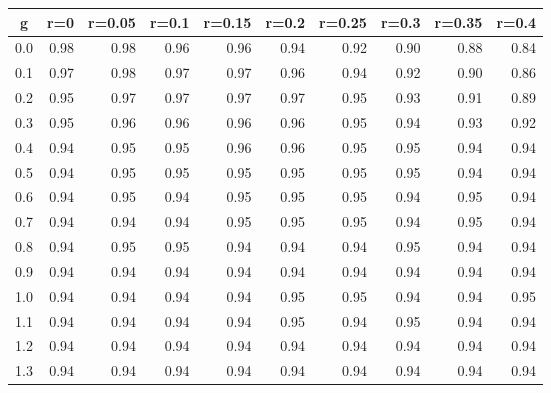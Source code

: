 %
\begin{table}[!tbp]
 \begin{center}
 \begin{tabular}{rrrrrrrrrr}\hline\hline
\multicolumn{1}{c}{g}&\multicolumn{1}{c}{r=0}&\multicolumn{1}{c}{r=0.05}&\multicolumn{1}{c}{r=0.1}&\multicolumn{1}{c}{r=0.15}&\multicolumn{1}{c}{r=0.2}&\multicolumn{1}{c}{r=0.25}&\multicolumn{1}{c}{r=0.3}&\multicolumn{1}{c}{r=0.35}&\multicolumn{1}{c}{r=0.4}\tabularnewline
\hline
0.0&0.98&0.98&0.96&0.96&0.94&0.92&0.90&0.88&0.84\tabularnewline
0.1&0.97&0.98&0.97&0.97&0.96&0.94&0.92&0.90&0.86\tabularnewline
0.2&0.95&0.97&0.97&0.97&0.97&0.95&0.93&0.91&0.89\tabularnewline
0.3&0.95&0.96&0.96&0.96&0.96&0.95&0.94&0.93&0.92\tabularnewline
0.4&0.94&0.95&0.95&0.96&0.96&0.95&0.95&0.94&0.94\tabularnewline
0.5&0.94&0.95&0.95&0.95&0.95&0.95&0.95&0.94&0.94\tabularnewline
0.6&0.94&0.95&0.94&0.95&0.95&0.95&0.94&0.95&0.94\tabularnewline
0.7&0.94&0.94&0.94&0.95&0.95&0.95&0.94&0.95&0.94\tabularnewline
0.8&0.94&0.95&0.95&0.94&0.94&0.94&0.95&0.94&0.94\tabularnewline
0.9&0.94&0.94&0.94&0.94&0.94&0.94&0.94&0.94&0.94\tabularnewline
1.0&0.94&0.94&0.94&0.94&0.95&0.95&0.94&0.94&0.95\tabularnewline
1.1&0.94&0.94&0.94&0.94&0.95&0.94&0.95&0.94&0.94\tabularnewline
1.2&0.94&0.94&0.94&0.94&0.94&0.94&0.94&0.94&0.94\tabularnewline
1.3&0.94&0.94&0.94&0.94&0.94&0.94&0.94&0.94&0.94\tabularnewline
\hline
\end{tabular}

\end{center}

\end{table}

